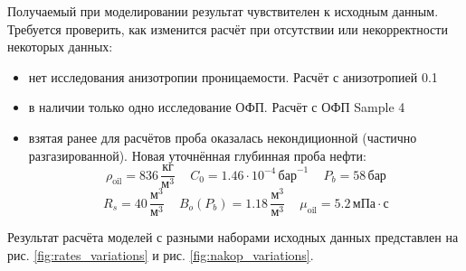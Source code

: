 \documentclass[a4paper,12pt]{article}
\begin{document}
Получаемый при моделировании результат чувствителен к исходным данным.
Требуется проверить, как изменится расчёт при отсутствии или некорректности некоторых данных:

\begin{itemize}
	\item нет исследования анизотропии проницаемости. Расчёт с анизотропией 0.1
	\item в наличии только одно исследование ОФП. Расчёт с ОФП Sample 4
	\item взятая ранее для расчётов проба оказалась некондиционной (частично разгазированной). Новая уточнённая глубинная проба нефти:
	$$\rho_{\text{oil}}=836\,\frac{\text{кг}}{\text{м}^3}
	\,\,\,\,\,\,\,C_0=1.46\cdot10^{-4}\,\text{бар}^{-1}
	\,\,\,\,\,\,\,P_b=58\,\text{бар}$$
	$$R_s=40\,\frac{\text{м}^3}{\text{м}^3}
	\,\,\,\,\,\,\,B_o\!\left(P_b\right)=1.18\,\frac{\text{м}^3}{\text{м}^3}
	\,\,\,\,\,\,\,\mu_{\text{oil}}=5.2\,\text{мПа}\cdot\text{с}$$
\end{itemize}

Результат расчёта моделей с разными наборами исходных данных представлен на рис. \ref{fig:rates_variations} и рис. \ref{fig:nakop_variations}.
\end{document}
